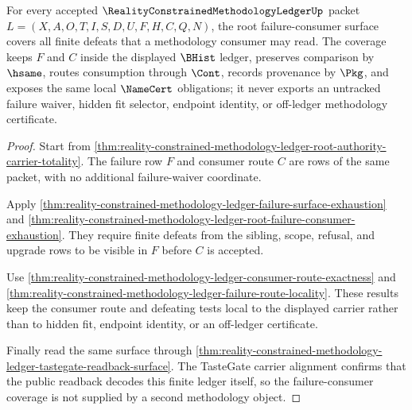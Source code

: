 \begin{theorem}
\label{thm:reality-constrained-methodology-ledger-failure-consumer-ledger-coverage}
For every accepted $\RealityConstrainedMethodologyLedgerUp$ packet $L=(X,A,O,T,I,S,D,U,F,H,C,Q,N)$, the root failure-consumer surface covers all finite defeats that a methodology consumer may read. The coverage keeps $F$ and $C$ inside the displayed $\BHist$ ledger, preserves comparison by $\hsame$, routes consumption through $\Cont$, records provenance by $\Pkg$, and exposes the same local $\NameCert$ obligations; it never exports an untracked failure waiver, hidden fit selector, endpoint identity, or off-ledger methodology certificate.
\end{theorem}
\begin{proof}
Start from \autoref{thm:reality-constrained-methodology-ledger-root-authority-carrier-totality}. The failure row $F$ and consumer route $C$ are rows of the same packet, with no additional failure-waiver coordinate.

Apply \autoref{thm:reality-constrained-methodology-ledger-failure-surface-exhaustion} and \autoref{thm:reality-constrained-methodology-ledger-root-failure-consumer-exhaustion}. They require finite defeats from the sibling, scope, refusal, and upgrade rows to be visible in $F$ before $C$ is accepted.

Use \autoref{thm:reality-constrained-methodology-ledger-consumer-route-exactness} and \autoref{thm:reality-constrained-methodology-ledger-failure-route-locality}. These results keep the consumer route and defeating tests local to the displayed carrier rather than to hidden fit, endpoint identity, or an off-ledger certificate.

Finally read the same surface through \autoref{thm:reality-constrained-methodology-ledger-tastegate-readback-surface}. The TasteGate carrier alignment confirms that the public readback decodes this finite ledger itself, so the failure-consumer coverage is not supplied by a second methodology object.
\end{proof}
